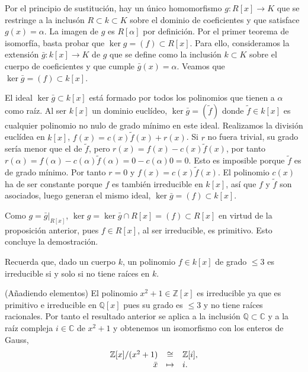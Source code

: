 
Por el principio de sustitución, hay un único homomorfismo
\(g\colon R[x]\rightarrow K\) que se restringe a la inclusón
\(R\subset k\subset K\) sobre el dominio de coeficientes y que satisface
\(g(x)=\alpha\). La imagen de \(g\) es \(R[\alpha]\) por definición. Por
el primer teorema de isomorfía, basta probar que
\(\ker g=(f)\subset R[x]\). Para ello, consideramos la extensión
\(\bar g\colon k[x]\rightarrow K\) de \(g\) que se define como la
inclusión \(k\subset K\) sobre el cuerpo de coeficientes y que cumple
\(\bar{g}(x)=\alpha\). Veamos que \(\ker\bar{g}=(f)\subset k[x]\).

El ideal \(\ker\bar{g}\subset k[x]\) está formado por todos los
polinomios que tienen a \(\alpha\) como raíz. Al ser \(k[x]\) un dominio
euclídeo, \(\ker\bar{g}=(\tilde f)\) donde \(\tilde f\in k[x]\) es
cualquier polinomio no nulo de grado mínimo en este ideal. Realizamos la
división euclídea en \(k[x]\), \(f(x)=c(x)\tilde{f}(x)+r(x)\). Si \(r\)
no fuera trivial, su grado sería menor que el de \(\tilde{f}\), pero
\(r(x)=f(x)-c(x)\tilde{f}(x)\), por tanto
\(r(\alpha)=f(\alpha)-c(\alpha)\tilde{f}(\alpha)=0-c(\alpha)0=0\). Esto
es imposible porque \(\tilde{f}\) es de grado mínimo. Por tanto \(r=0\)
y \(f(x)=c(x)\tilde{f}(x)\). El polinomio \(c(x)\) ha de ser constante
porque \(f\) es también irreducible en \(k[x]\), así que \(f\) y
\(\tilde{f}\) son asociados, luego generan el mismo ideal,
\(\ker\bar{g}=(f)\subset k[x]\).

Como \(g=\bar{g}|_{R[x]}\),
\(\ker g=\ker\bar{g}\cap R[x]=(f)\subset R[x]\) en virtud de la
proposición anterior, pues \(f\in R[x]\), al ser irreducible, es
primitivo. Esto concluye la demostración. 


Recuerda que, dado un cuerpo \(k\), un polinomio \(f\in k[x]\) de grado
\(\leq 3\) es irreducible si y solo si no tiene raíces en \(k\).

\textrm{\normalfont (Añadiendo elementos)} El polinomio
\(x^2+1\in\mathbb{Z}[x]\) es irreducible ya que es primitivo e
irreducible en \(\mathbb{Q}[x]\) pues su grado es \(\leq 3\) y no tiene
raíces racionales. Por tanto el resultado anterior se aplica a la
inclusión \(\mathbb Q\subset\mathbb C\) y a la raíz compleja
\(i\in\mathbb C\) de \(x^2+1\) y obtenemos un isomorfismo con los
enteros de Gauss, \[
\begin{array}{rcl}
\mathbb Z[x]/(x^2+1)&\cong&\mathbb Z[i],\cr
 \bar{x}&\mapsto& i.
\end{array}
\]

